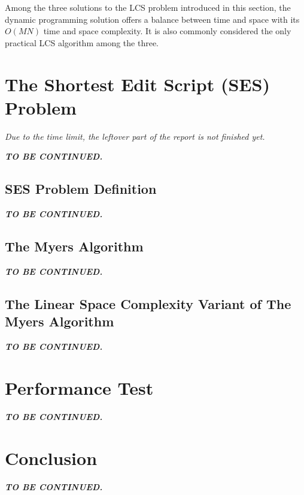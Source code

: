 \documentclass[sigplan,screen]{acmart}
\begin{document}
Among the three solutions to the LCS problem introduced in this section, the dynamic programming solution offers a balance between time and space with its $O(MN)$ time and space complexity. It is also commonly considered the only practical LCS algorithm among the three.


\section{The Shortest Edit Script (SES) Problem}
\label{section:ses}

\textit{Due to the time limit, the leftover part of the report is not finished yet.}

\textbf{\textit{TO BE CONTINUED.}}

\subsection{SES Problem Definition}

\textbf{\textit{TO BE CONTINUED.}}

\subsection{The Myers Algorithm}

\textbf{\textit{TO BE CONTINUED.}}

\subsection{The Linear Space Complexity Variant of The Myers Algorithm}

\textbf{\textit{TO BE CONTINUED.}}


\section{Performance Test}

\textbf{\textit{TO BE CONTINUED.}}

\section{Conclusion}

\textbf{\textit{TO BE CONTINUED.}}
\end{document}

